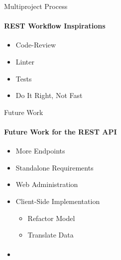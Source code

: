     \begin{frame}[t]{Multiproject Process}\framesubtitle{REST Workflow Inspirations}
        \begin{itemize}
            \item Code-Review
            \item Linter
            \item Tests
            \item Do It Right, Not Fast
        \end{itemize}
    \end{frame}

    \begin{frame}[t]{Future Work}\framesubtitle{Future Work for the REST API}
        \begin{itemize}            
            \item More Endpoints
            \item Standalone Requirements
            \item Web Administration
            \item Client-Side Implementation
            \begin{itemize}
                \item Refactor Model
                \item Translate Data
            \end{itemize}
        \end{itemize}
    \end{frame}

    \begin{frame}[t]{}\framesubtitle{}
        \begin{itemize} 
            \item
        \end{itemize}
    \end{frame}